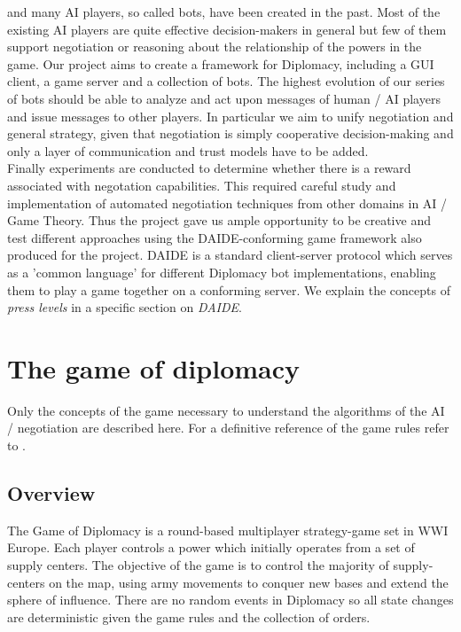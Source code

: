 \documentclass[pdftex,12pt,a4paper]{report}
\begin{document}
 and many AI
players, so called bots, have been created in the past. Most of the
existing AI players are quite effective decision-makers in general but
few of them support negotiation or reasoning about the relationship of
the powers in the game. Our project aims to create a framework for
Diplomacy, including a GUI client, a game server and a collection of
bots. The highest evolution of our series of bots should be able to
analyze and act upon messages of human / AI players and issue messages
to other players. In particular we aim to unify negotiation and
general strategy, given that negotiation is simply 
cooperative decision-making and only a layer of communication and
trust models have to be added. \\

Finally experiments are conducted to determine whether there is a
reward associated with negotation capabilities. This required careful
study and implementation of automated negotiation techniques from
other domains in AI / Game Theory. Thus the project gave us ample
opportunity to be creative and test different approaches using the
DAIDE-conforming game framework also produced for the project. DAIDE
is a standard client-server protocol \cite{DaideWeb} which serves as a
'common language' for different Diplomacy bot implementations,
enabling them to play a game together on a conforming server. We
explain the concepts of \textit{press levels} in a specific section on
\textit{DAIDE}.


\pagebreak

\section{The game of diplomacy}

Only the concepts of the game necessary to understand the 
algorithms of the AI / negotiation are described here. For a
definitive reference of the game rules refer to \cite{DiploRules00}.

\subsection{Overview}

The Game of Diplomacy is a round-based multiplayer strategy-game set
in WWI Europe. Each player controls a power which initially
operates from a set of supply centers. The objective of the game is
to control the majority of supply-centers on the map, using army
movements to conquer new bases and extend the sphere of influence.
There are no random events in Diplomacy so all state changes are
deterministic given the game rules and the collection of orders.  \\ 
\end{document}
